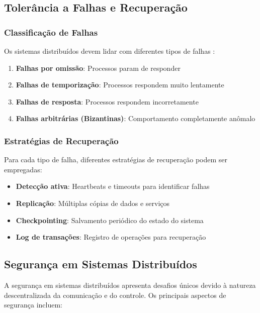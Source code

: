 \subsection{Tolerância a Falhas e Recuperação}

\subsubsection{Classificação de Falhas}

Os sistemas distribuídos devem lidar com diferentes tipos de falhas \cite{coulouris2013sistemas}:

\begin{enumerate}
    \item \textbf{Falhas por omissão}: Processos param de responder
    \item \textbf{Falhas de temporização}: Processos respondem muito lentamente
    \item \textbf{Falhas de resposta}: Processos respondem incorretamente
    \item \textbf{Falhas arbitrárias (Bizantinas)}: Comportamento completamente anômalo
\end{enumerate}

\subsubsection{Estratégias de Recuperação}

Para cada tipo de falha, diferentes estratégias de recuperação podem ser empregadas:

\begin{itemize}
    \item \textbf{Detecção ativa}: Heartbeats e timeouts para identificar falhas
    \item \textbf{Replicação}: Múltiplas cópias de dados e serviços
    \item \textbf{Checkpointing}: Salvamento periódico do estado do sistema
    \item \textbf{Log de transações}: Registro de operações para recuperação
\end{itemize}

\subsection{Segurança em Sistemas Distribuídos}

A segurança em sistemas distribuídos apresenta desafios únicos devido à natureza descentralizada da comunicação e do controle. Os principais aspectos de segurança incluem:

